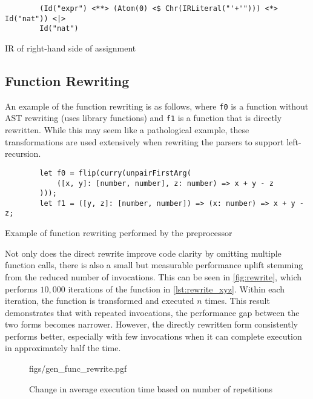 \begin{capminted}
    \begin{verbatim}
        (Id("expr") <**> (Atom(0) <$ Chr(IRLiteral("'+'"))) <*> Id("nat")) <|>
        Id("nat")
    \end{verbatim}
    \vspace{-0.5\baselineskip}
    \caption{IR of right-hand side of assignment}
    \label{lst:running_ir}
\end{capminted}

\subsection{Function Rewriting}
\label{ssec:func_rewrite}
An example of the function rewriting is as follows, where \texttt{f0} is a function without AST rewriting (uses library functions) and \texttt{f1} is a function that is directly rewritten.
While this may seem like a pathological example, these transformations are used extensively when rewriting the parsers to support left-recursion.

\begin{capminted}
    \begin{verbatim}
        let f0 = flip(curry(unpairFirstArg(
            ([x, y]: [number, number], z: number) => x + y - z
        )));
        let f1 = ([y, z]: [number, number]) => (x: number) => x + y - z;
    \end{verbatim}
    \vspace{-0.5\baselineskip}
    \caption{Example of function rewriting performed by the preprocessor}
    \label{lst:rewrite_xyz}
\end{capminted}

Not only does the direct rewrite improve code clarity by omitting multiple function calls, there is also a small but measurable performance uplift stemming from the reduced number of invocations.
This can be seen in \autoref{fig:rewrite}, which performs $10,000$ iterations of the function in \autoref{lst:rewrite_xyz}.
Within each iteration, the function is transformed and executed $n$ times.
This result demonstrates that with repeated invocations, the performance gap between the two forms becomes narrower.
However, the directly rewritten form consistently performs better, especially with few invocations when it can complete execution in approximately half the time.

\begin{figure}[H]
    \centering
    {figs/gen_func_rewrite.pgf}
    \vspace{-0.5\baselineskip}
    \caption{Change in average execution time based on number of repetitions}
    \label{fig:rewrite}
\end{figure}
